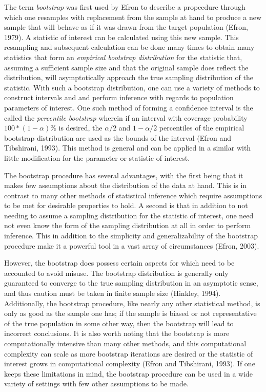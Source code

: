 		The term \textit{bootstrap} was first used by Efron to describe a propcedure through which one resamples with replacement from the sample at hand to produce a new sample that will behave as if it
		was drawn from the target population (Efron, 1979). A statistic of interest can be calculated using this new sample. This resampling and subsequent calculation can be done many times to obtain many statistics that form an
		\textit{empirical bootstrap distribution} for the statistic that, assuming a sufficient sample size and that the original sample does reflect the distribution, will asymptotically approach the
		true sampling distribution of the statistic. With such a bootstrap distribution, one can use a variety of methods to construct intervals and and perform inference with regards to population
		parameters of interest. One such method of forming a confidence interval is the called the \textit{percentile bootstrap} wherein if an interval with coverage probability $100*(1-\alpha) \%$ is
		desired, the $\alpha/2$ and $1-\alpha/2$ percentiles of the empirical bootstrap distribution are used as the bounds of the interval (Efron and Tibshirani, 1993). This method is general and
		can be applied in a similar with little modification for the parameter or statistic of interest.

		The bootstrap procedure has several advantages, with the first being that it makes few assumptions about the distribution of the data at hand. This is in contrast to many other methods of
		statistical inference which require assumptions to be met for desirable properties to hold. A second is that in addition to not needing to assume a sampling distribution for the statistic
		of interest, one need not even know the form of the sampling distribution at all in order to perform inference. This in addition to the simplicity and generalizability of the bootstrap procedure
		make it a powerful tool in a vast array of circumstances  (Efron, 2003).

		However, the bootstrap does possess certain aspects for which need to be accounted to avoid misuse. The bootstrap distribution is generally only guaranteed to converge to the true sampling
		distribution in an asymptotic sense, and thus caution must be taken in finite sample size (Hinkley, 1994). Additionally, the bootstrap procedure, like nearly any other statistical method,
		is only as good as the sample one has; if the sample is biased or not representative of the true population in some other way, then the bootstrap will lead to incorrect conclusions. It is also
		worth noting that the bootstrap is more computationally intensive than many other methods, and this computational complexity can scale as more bootstrap iterations are desired or the statistic
		of interest grows in computational complexity (Efron and Tibshirani, 1993). If one keeps these limitations in mind, the bootstrap procedure can be used in a wide variety of settings with few
		other assumptions to be made.

